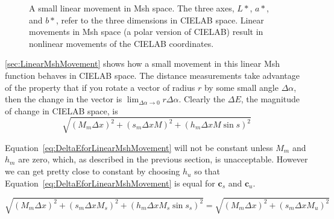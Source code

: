 \documentclass{llncs}
\newcommand{\Lab}{CIELAB\xspace}
\newcommand{\Msh}{Msh\xspace}
\newcommand{\DeltaE}{\ensuremath{\Delta{}E}\xspace}
\newcommand*{\cvec}[1]{\mathbf{#1}}
\begin{document}
\begin{figure}
  \centering
  \caption{A small linear movement in \Msh space.  The three axes, $L*$,
    $a*$, and $b*$, refer to the three dimensions in \Lab space.  Linear
    movements in \Msh space (a polar version of \Lab) result in nonlinear
    movements of the \Lab coordinates.}
  \label{sec:LinearMshMovement}
\end{figure}

\autoref{sec:LinearMshMovement} shows how a small movement in this
linear \Msh function behaves in \Lab space.  The distance measurements take
advantage of the property that if you rotate a vector of radius $r$ by some
small angle $\Delta\alpha$, then the change in the vector is
$\lim_{\Delta\alpha \rightarrow 0}r \Delta\alpha$.  Clearly the \DeltaE,
the magnitude of change in \Lab space, is
\begin{equation}
  \sqrt{(M_m \Delta x)^2 + (s_m \Delta x M)^2 + (h_m \Delta x M \sin s)^2}
  \label{eq:DeltaEforLinearMshMovement}
\end{equation}

Equation~\ref{eq:DeltaEforLinearMshMovement} will not be constant unless
$M_m$ and $h_m$ are zero, which, as described in the previous section, is
unacceptable.  However we can get pretty close to constant by choosing
$h_u$ so that Equation~\ref{eq:DeltaEforLinearMshMovement} is equal for
$\cvec{c}_s$ and $\cvec{c}_u$.

\begin{equation}
  \sqrt{(M_m \Delta x)^2 + (s_m \Delta x M_s)^2 + (h_m \Delta x M_s \sin s_s)^2}
  =
  \sqrt{(M_m \Delta x)^2 + (s_m \Delta x M_u)^2}
  \label{eqn:hm_criterion}
\end{equation}
\end{document}
